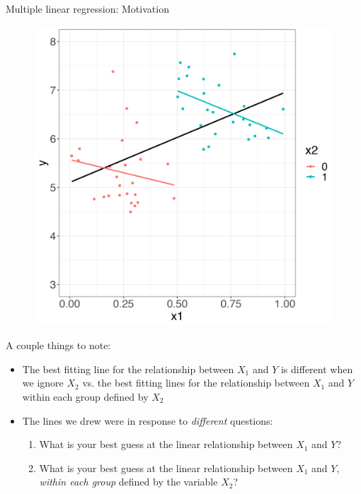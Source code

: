 \documentclass[10pt,t]{beamer}
\begin{document}
\begin{frame}{Multiple linear regression: Motivation}
	\vspace{-0.5cm}
\begin{figure}
	\centering \includegraphics[scale=0.2]{multreg4.png}
\end{figure}

A couple things to note:

\begin{itemize}
	\item The best fitting line for the relationship between $X_1$ and $Y$ is different when we ignore $X_2$ vs. the best fitting lines for the relationship between $X_1$ and $Y$ within each group defined by $X_2$
	\item The lines we drew were in response to \textit{different} questions:
	\begin{enumerate}
		\item What is your best guess at the linear relationship between $X_1$ and $Y$?
		\item What is your best guess at the linear relationship between $X_1$ and $Y$, \textit{within each group} defined by the variable $X_2$? 
	\end{enumerate}
\end{itemize}

\end{frame}
\end{document}
